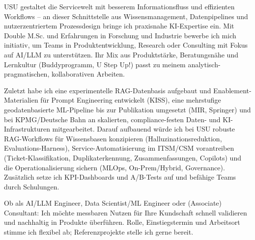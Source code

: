 USU gestaltet die Servicewelt mit besserem Informationsfluss und effizienten Workflows – an dieser Schnittstelle aus Wissensmanagement, Datenpipelines und nutzerzentriertem Prozessdesign bringe ich praxisnahe KI-Expertise ein. Mit Double M.Sc. und Erfahrungen in Forschung und Industrie bewerbe ich mich initiativ, um Teams in Produktentwicklung, Research oder Consulting mit Fokus auf AI/LLM zu unterstützen. Ihr Mix aus Produktstärke, Beratungsnähe und Lernkultur (Buddyprogramm, U Step Up!) passt zu meinem analytisch-pragmatischen, kollaborativen Arbeiten.

Zuletzt habe ich eine experimentelle RAG-Datenbasis aufgebaut und Enablement-Materialien für Prompt Engineering entwickelt (KISS), eine mehrstufige geodatenbasierte ML-Pipeline bis zur Publikation umgesetzt (MIR, Springer) und bei KPMG/Deutsche Bahn an skalierten, compliance-festen Daten- und KI-Infrastrukturen mitgearbeitet. Darauf aufbauend würde ich bei USU robuste RAG-Workflows für Wissensbasen konzipieren (Halluzinationsreduktion, Evaluations-Harness), Service-Automatisierung im ITSM/CSM vorantreiben (Ticket-Klassifikation, Duplikaterkennung, Zusammenfassungen, Copilots) und die Operationalisierung sichern (MLOps, On-Prem/Hybrid, Governance). Zusätzlich setze ich KPI-Dashboards und A/B-Tests auf und befähige Teams durch Schulungen.

Ob als AI/LLM Engineer, Data Scientist/ML Engineer oder (Associate) Consultant: Ich möchte messbaren Nutzen für Ihre Kundschaft schnell validieren und nachhaltig in Produkte überführen. Rolle, Einstiegstermin und Arbeitsort stimme ich flexibel ab; Referenzprojekte stelle ich gerne bereit.